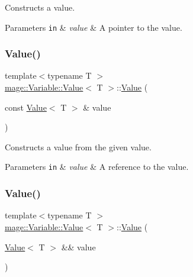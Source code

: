 Constructs a value.


\begin{DoxyParams}[1]{Parameters}
\mbox{\tt in}  & {\em value} & A pointer to the value. \\
\hline
\end{DoxyParams}
\hypertarget{structmage_1_1_variable_1_1_value_a89ed544e50981c1714f21a31f499b041}{}\label{structmage_1_1_variable_1_1_value_a89ed544e50981c1714f21a31f499b041} 
\subsubsection{\texorpdfstring{Value()}{Value()}\hspace{0.1cm}{\footnotesize\ttfamily [2/3]}}
{\footnotesize\ttfamily template$<$typename T $>$ \\
\hyperlink{structmage_1_1_variable_1_1_value}{mage\+::\+Variable\+::\+Value}$<$ T $>$\+::\hyperlink{structmage_1_1_variable_1_1_value}{Value} (\begin{DoxyParamCaption}\item[{const \hyperlink{structmage_1_1_variable_1_1_value}{Value}$<$ T $>$ \&}]{value }\end{DoxyParamCaption})\hspace{0.3cm}{\ttfamily [delete]}}

Constructs a value from the given value.


\begin{DoxyParams}[1]{Parameters}
\mbox{\tt in}  & {\em value} & A reference to the value. \\
\hline
\end{DoxyParams}
\hypertarget{structmage_1_1_variable_1_1_value_aeadb858e9a40f211c787cacc2fb2843b}{}\label{structmage_1_1_variable_1_1_value_aeadb858e9a40f211c787cacc2fb2843b} 
\subsubsection{\texorpdfstring{Value()}{Value()}\hspace{0.1cm}{\footnotesize\ttfamily [3/3]}}
{\footnotesize\ttfamily template$<$typename T $>$ \\
\hyperlink{structmage_1_1_variable_1_1_value}{mage\+::\+Variable\+::\+Value}$<$ T $>$\+::\hyperlink{structmage_1_1_variable_1_1_value}{Value} (\begin{DoxyParamCaption}\item[{\hyperlink{structmage_1_1_variable_1_1_value}{Value}$<$ T $>$ \&\&}]{value }\end{DoxyParamCaption})\hspace{0.3cm}{\ttfamily [default]}}

